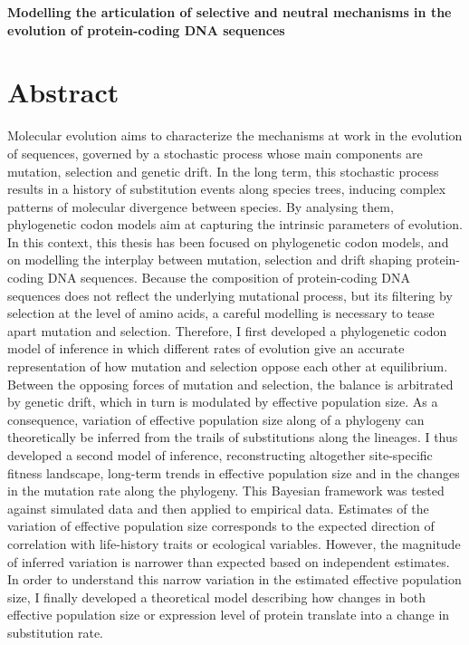 \begin{center}
	\LARGE
	\textbf{Modelling the articulation of selective and neutral mechanisms in the evolution of protein-coding DNA sequences}
\end{center}

\section*{Abstract}

Molecular evolution aims to characterize the mechanisms at work in the evolution of sequences, governed by a stochastic process whose main components are mutation, selection and genetic drift.
In the long term, this stochastic process results in a history of substitution events along species trees, inducing complex patterns of molecular divergence between species.
By analysing them, phylogenetic codon models aim at capturing the intrinsic parameters of evolution.
In this context, this thesis has been focused on phylogenetic codon models, and on modelling the interplay between mutation, selection and drift shaping protein-coding DNA sequences.
Because the composition of protein-coding DNA sequences does not reflect the underlying mutational process, but its filtering by selection at the level of amino acids, a careful modelling is necessary to tease apart mutation and selection.
Therefore, I first developed a phylogenetic codon model of inference in which different rates of evolution give an accurate representation of how mutation and selection oppose each other at equilibrium.
Between the opposing forces of mutation and selection, the balance is arbitrated by genetic drift, which in turn is modulated by effective population size.
As a consequence, variation of effective population size along of a phylogeny can theoretically be inferred from the trails of substitutions along the lineages.
I thus developed a second model of inference, reconstructing altogether site-specific fitness landscape, long-term trends in effective population size and in the changes in the mutation rate along the phylogeny.
This Bayesian framework was tested against simulated data and then applied to empirical data.
Estimates of the variation of effective population size corresponds to the expected direction of correlation with life-history traits or ecological variables.
However, the magnitude of inferred variation is narrower than expected based on independent estimates.
In order to understand this narrow variation in the estimated effective population size, I finally developed a theoretical model describing how changes in both effective population size or expression level of protein translate into a change in substitution rate.
